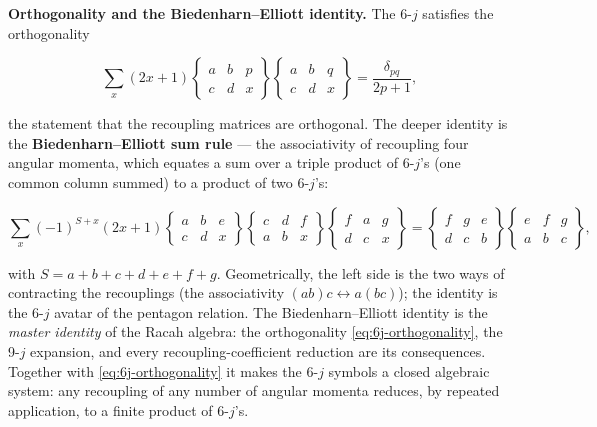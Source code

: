 \medskip\noindent\textbf{Orthogonality and the Biedenharn--Elliott identity.} The 6-$j$ satisfies the orthogonality
\begin{linenomath}
\begin{equation}
\sum_{x}(2x+1)\begin{Bmatrix}a&b&p\\ c&d&x\end{Bmatrix}\!\begin{Bmatrix}a&b&q\\ c&d&x\end{Bmatrix}=\frac{\delta_{pq}}{2p+1},
\label{eq:6j-orthogonality}
\end{equation}
\end{linenomath}
the statement that the recoupling matrices are orthogonal. The deeper identity is the \textbf{Biedenharn--Elliott sum rule} --- the associativity of recoupling four angular momenta, which equates a sum over a triple product of 6-$j$'s (one common column summed) to a product of two 6-$j$'s:
\begin{linenomath}
\begin{equation}
\sum_{x}(-1)^{S+x}(2x+1)\begin{Bmatrix}a&b&e\\ c&d&x\end{Bmatrix}\!\begin{Bmatrix}c&d&f\\ a&b&x\end{Bmatrix}\!\begin{Bmatrix}f&a&g\\ d&c&x\end{Bmatrix}
=\begin{Bmatrix}f&g&e\\ d&c&b\end{Bmatrix}\!\begin{Bmatrix}e&f&g\\ a&b&c\end{Bmatrix},
\label{eq:biedenharn-elliott}
\end{equation}
\end{linenomath}
with $S=a+b+c+d+e+f+g$. Geometrically, the left side is the two ways of contracting the recouplings (the associativity $(ab)c\leftrightarrow a(bc)$); the identity is the 6-$j$ avatar of the pentagon relation. The Biedenharn--Elliott identity is the \emph{master identity} of the Racah algebra: the orthogonality \eqref{eq:6j-orthogonality}, the 9-$j$ expansion, and every recoupling-coefficient reduction are its consequences. Together with \eqref{eq:6j-orthogonality} it makes the 6-$j$ symbols a closed algebraic system: any recoupling of any number of angular momenta reduces, by repeated application, to a finite product of 6-$j$'s.

